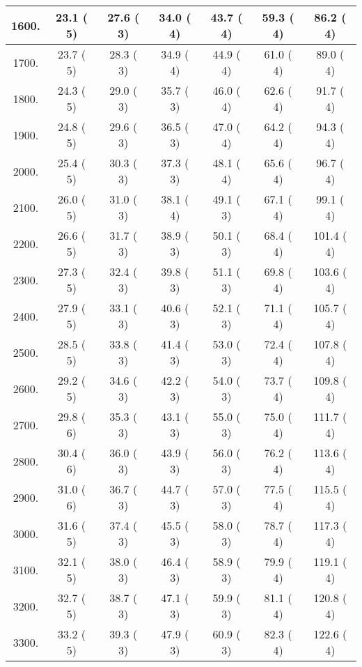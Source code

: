 \begin{tabular}{|c||c|c|c|c|c|c|}
\hline
 1600. &    23.1 (      5) &    27.6 (      3) &    34.0 (      4) &    43.7 (      4) &    59.3 (      4) &    86.2 (      4)\tabularnewline
\hline
 1700. &    23.7 (      5) &    28.3 (      3) &    34.9 (      4) &    44.9 (      4) &    61.0 (      4) &    89.0 (      4)\tabularnewline
\hline
 1800. &    24.3 (      5) &    29.0 (      3) &    35.7 (      3) &    46.0 (      4) &    62.6 (      4) &    91.7 (      4)\tabularnewline
\hline
 1900. &    24.8 (      5) &    29.6 (      3) &    36.5 (      3) &    47.0 (      4) &    64.2 (      4) &    94.3 (      4)\tabularnewline
\hline
 2000. &    25.4 (      5) &    30.3 (      3) &    37.3 (      3) &    48.1 (      4) &    65.6 (      4) &    96.7 (      4)\tabularnewline
\hline
 2100. &    26.0 (      5) &    31.0 (      3) &    38.1 (      4) &    49.1 (      3) &    67.1 (      4) &    99.1 (      4)\tabularnewline
\hline
 2200. &    26.6 (      5) &    31.7 (      3) &    38.9 (      3) &    50.1 (      3) &    68.4 (      4) &   101.4 (      4)\tabularnewline
\hline
 2300. &    27.3 (      5) &    32.4 (      3) &    39.8 (      3) &    51.1 (      3) &    69.8 (      4) &   103.6 (      4)\tabularnewline
\hline
 2400. &    27.9 (      5) &    33.1 (      3) &    40.6 (      3) &    52.1 (      3) &    71.1 (      4) &   105.7 (      4)\tabularnewline
\hline
 2500. &    28.5 (      5) &    33.8 (      3) &    41.4 (      3) &    53.0 (      3) &    72.4 (      4) &   107.8 (      4)\tabularnewline
\hline
 2600. &    29.2 (      5) &    34.6 (      3) &    42.2 (      3) &    54.0 (      3) &    73.7 (      4) &   109.8 (      4)\tabularnewline
\hline
 2700. &    29.8 (      6) &    35.3 (      3) &    43.1 (      3) &    55.0 (      3) &    75.0 (      4) &   111.7 (      4)\tabularnewline
\hline
 2800. &    30.4 (      6) &    36.0 (      3) &    43.9 (      3) &    56.0 (      3) &    76.2 (      4) &   113.6 (      4)\tabularnewline
\hline
 2900. &    31.0 (      6) &    36.7 (      3) &    44.7 (      3) &    57.0 (      3) &    77.5 (      4) &   115.5 (      4)\tabularnewline
\hline
 3000. &    31.6 (      5) &    37.4 (      3) &    45.5 (      3) &    58.0 (      3) &    78.7 (      4) &   117.3 (      4)\tabularnewline
\hline
 3100. &    32.1 (      5) &    38.0 (      3) &    46.4 (      3) &    58.9 (      3) &    79.9 (      4) &   119.1 (      4)\tabularnewline
\hline
 3200. &    32.7 (      5) &    38.7 (      3) &    47.1 (      3) &    59.9 (      3) &    81.1 (      4) &   120.8 (      4)\tabularnewline
\hline
 3300. &    33.2 (      5) &    39.3 (      3) &    47.9 (      3) &    60.9 (      3) &    82.3 (      4) &   122.6 (      4)\tabularnewline

\end{tabular}
